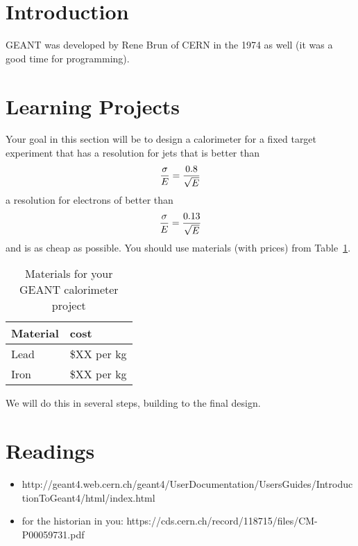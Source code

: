 \section{Introduction}
GEANT was developed by Rene Brun of CERN in the 1974 as well (it was a good time for programming).


\section{Learning Projects}
Your goal in this section will be to design a calorimeter for a fixed target experiment that has a resolution for jets that is better than
$$
{\sigma \over E} = {0.8 \over \sqrt{E}}
$$
a resolution for electrons of better than
$$
{\sigma \over E} = {0.13 \over \sqrt{E}}
$$
and is as cheap as possible.  You should use materials (with prices)
from Table~\ref{tab:materialsGEANT}. 



\begin{table}[thb]
\centering
\caption{
Materials for your GEANT calorimeter project
}
\label{tab:materialsGEANT}
{\small
\begin{tabular}{|l| l|}
\hline
Material  &  cost \\
\hline
\hline
Lead & \$XX per kg \\
Iron & \$XX per kg \\ \hline
\hline
\end{tabular}
}
\end{table}


We will do this in several steps, building to the final design.

\section{Readings}
\begin{itemize}
\item http://geant4.web.cern.ch/geant4/UserDocumentation/UsersGuides/IntroductionToGeant4/html/index.html
  \item for the historian in you: https://cds.cern.ch/record/118715/files/CM-P00059731.pdf
\end{itemize}

